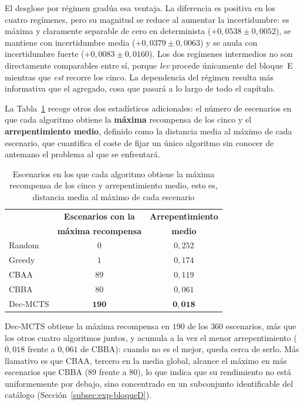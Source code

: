 El desglose por régimen gradúa esa ventaja. La diferencia es positiva en los cuatro regímenes, pero su magnitud se reduce al aumentar la incertidumbre: es máxima y claramente separable de cero en determinista ($+0{,}0538 \pm 0{,}0052$), se mantiene con incertidumbre media ($+0{,}0379 \pm 0{,}0063$) y se anula con incertidumbre fuerte ($+0{,}0083 \pm 0{,}0160$). Los dos regímenes intermedios no son directamente comparables entre sí, porque \emph{lev} procede únicamente del bloque~E mientras que \emph{est} recorre los cinco. La dependencia del régimen resulta más informativa que el agregado, cosa que pasará a lo largo de todo el capítulo.

La Tabla~\ref{tab:res-dominancia} recoge otros dos estadísticos adicionales: el número de escenarios en que cada algoritmo obtiene la \textbf{máxima} recompensa de los cinco y el \textbf{arrepentimiento medio}, definido como la distancia media al máximo de cada escenario, que cuantifica el coste de fijar un único algoritmo sin conocer de antemano el problema al que se enfrentará.

\begin{table}[t]
\centering
\caption{Escenarios en los que cada algoritmo obtiene la máxima recompensa de los cinco y arrepentimiento medio, esto es, distancia media al máximo de
 cada escenario}
\label{tab:res-dominancia}
\small
\begin{tabular}{lcc}
\hline
 & \textbf{Escenarios con la} & \textbf{Arrepentimiento} \\
 & \textbf{máxima recompensa} & \textbf{medio} \\
\hline
Random    & $0$            & $0{,}252$ \\
Greedy    & $1$            & $0{,}174$ \\
CBAA      & $89$           & $0{,}119$ \\
CBBA      & $80$           & $0{,}061$ \\
Dec-MCTS  & $\mathbf{190}$ & $\mathbf{0{,}018}$ \\
\hline
\end{tabular}
\end{table}

Dec-MCTS obtiene la máxima recompensa en $190$ de los $360$ escenarios, más que los otros cuatro algoritmos juntos, y acumula a la vez el menor arrepentimiento ($0{,}018$ frente a $0{,}061$ de CBBA): cuando no es el mejor, queda cerca de serlo. Más llamativo es que CBAA, tercero en la media global, alcance el máximo en más escenarios que CBBA ($89$ frente a $80$), lo que indica que su rendimiento no está uniformemente por debajo, sino concentrado en un subconjunto identificable del catálogo (Sección~\ref{subsec:exp-bloqueD}).

